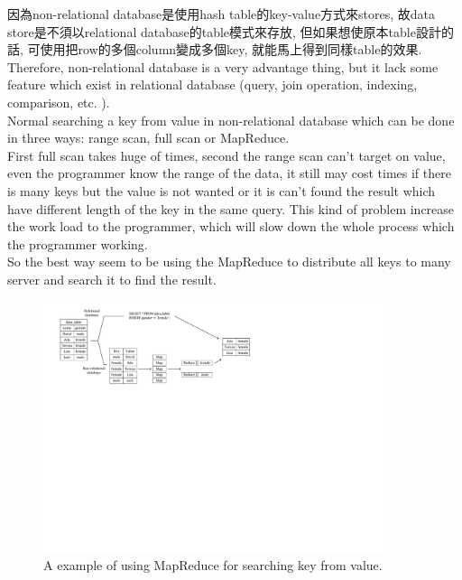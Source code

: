 因為non-relational database是使用hash table的key-value方式來stores, 故data store是不須以relational database的table模式來存放, 但如果想使原本table設計的話, 可使用把row的多個column變成多個key, 就能馬上得到同樣table的效果.\\

Therefore, non-relational database is a very advantage thing, but it lack some feature which exist in relational database (query, join operation, indexing, comparison, etc. ).\\

Normal searching a key from value in non-relational database which can be done in three ways: range scan, full scan or MapReduce.\\

First full scan takes huge of times, second the range scan can't target on value, even the programmer know the range of the data, it still may cost times if there is many keys but the value is not wanted or it is can't found the result which have different length of the key in the same query. This kind of problem increase the work load to the programmer, which will slow down the whole process which the programmer working.\\

So the best way seem to be using the MapReduce \cite{paper:google-mapreduce,web:wiki:mapreduce} to distribute all keys to many server and search it to find the result.\\

\begin{figure}[h]
\centering
\includegraphics[width=0.9\textwidth]{./introduction/pic/mapreduce_v3.pdf}
\caption{A example of using MapReduce for searching key from value.}
\label{fig:intro:mapreduce}
\end{figure}

